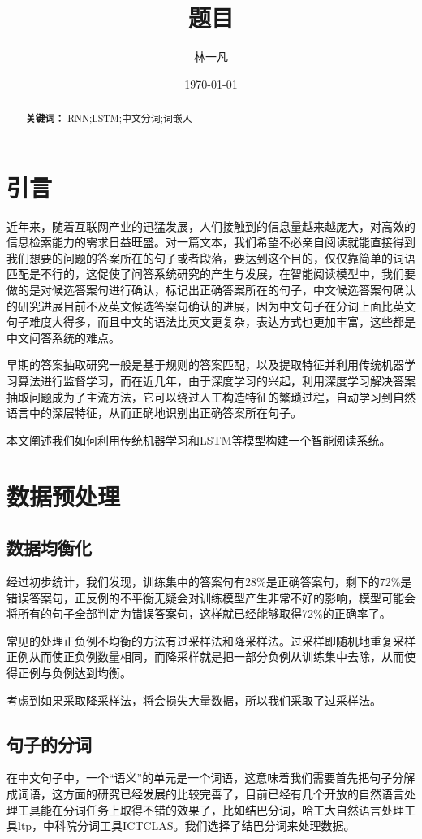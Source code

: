 \documentclass[UTF8]{ctexart}
\title{题目}
\author{林一凡\quad王佳璇\quad万宗祺}
\date{\today}
\begin{document}
\maketitle
\begin{abstract}
\begin{flushleft}
\textbf{关键词：} RNN;LSTM;中文分词;词嵌入
\end{flushleft}
\end{abstract}

\tableofcontents
\section{引言}
近年来，随着互联网产业的迅猛发展，人们接触到的信息量越来越庞大，对高效的信息检索能力的需求日益旺盛。对一篇文本，我们希望不必亲自阅读就能直接得到我们想要的问题的答案所在的句子或者段落，要达到这个目的，仅仅靠简单的词语匹配是不行的，这促使了问答系统研究的产生与发展，在智能阅读模型中，我们要做的是对候选答案句进行确认，标记出正确答案所在的句子，中文候选答案句确认的研究进展目前不及英文候选答案句确认的进展，因为中文句子在分词上面比英文句子难度大得多，而且中文的语法比英文更复杂，表达方式也更加丰富，这些都是中文问答系统的难点。

早期的答案抽取研究一般是基于规则的答案匹配，以及提取特征并利用传统机器学习算法进行监督学习，而在近几年，由于深度学习的兴起，利用深度学习解决答案抽取问题成为了主流方法，它可以绕过人工构造特征的繁琐过程，自动学习到自然语言中的深层特征，从而正确地识别出正确答案所在句子。

本文阐述我们如何利用传统机器学习和LSTM等模型构建一个智能阅读系统。
\section{数据预处理}
\subsection{数据均衡化}
经过初步统计，我们发现，训练集中的答案句有28\%是正确答案句，剩下的72\%是错误答案句，正反例的不平衡无疑会对训练模型产生非常不好的影响，模型可能会将所有的句子全部判定为错误答案句，这样就已经能够取得72\%的正确率了。

常见的处理正负例不均衡的方法有过采样法和降采样法。过采样即随机地重复采样正例从而使正负例数量相同，而降采样就是把一部分负例从训练集中去除，从而使得正例与负例达到均衡。

考虑到如果采取降采样法，将会损失大量数据，所以我们采取了过采样法。
\subsection{句子的分词}
在中文句子中，一个“语义”的单元是一个词语，这意味着我们需要首先把句子分解成词语，这方面的研究已经发展的比较完善了，目前已经有几个开放的自然语言处理工具能在分词任务上取得不错的效果了，比如结巴分词，哈工大自然语言处理工具ltp，中科院分词工具ICTCLAS。我们选择了结巴分词来处理数据。
\end{document}
